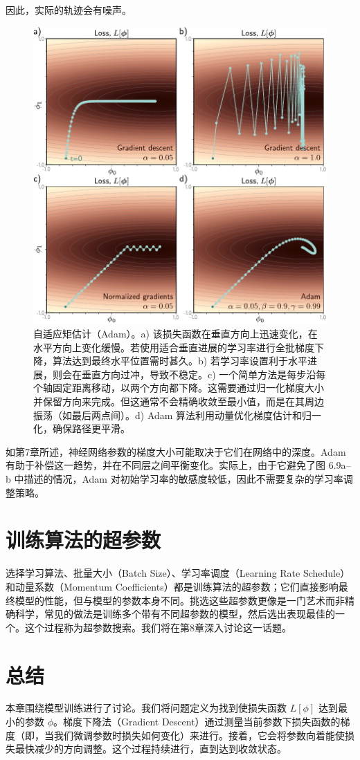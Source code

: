 \documentclass[lang=cn,newtx,10pt,scheme=chinese]{elegantbook}
\begin{document}
因此，实际的轨迹会有噪声。

\begin{figure}[ht!]
\centering
\includegraphics[width=0.7\linewidth]{PDFFigures/UDLChap6PDF/TrainADAM.pdf}
\caption{自适应矩估计（Adam）。a) 该损失函数在垂直方向上迅速变化，在水平方向上变化缓慢。若使用适合垂直进展的学习率进行全批梯度下降，算法达到最终水平位置需时甚久。b) 若学习率设置利于水平进展，则会在垂直方向过冲，导致不稳定。c) 一个简单方法是每步沿每个轴固定距离移动，以两个方向都下降。这需要通过归一化梯度大小并保留方向来完成。但这通常不会精确收敛至最小值，而是在其周边振荡（如最后两点间）。d) Adam 算法利用动量优化梯度估计和归一化，确保路径更平滑。}
\end{figure}

如第7章所述，神经网络参数的梯度大小可能取决于它们在网络中的深度。Adam 有助于补偿这一趋势，并在不同层之间平衡变化。实际上，由于它避免了图 6.9a–b 中描述的情况，Adam 对初始学习率的敏感度较低，因此不需要复杂的学习率调整策略。

\section{训练算法的超参数}
选择学习算法、批量大小（Batch Size）、学习率调度（Learning Rate Schedule）和动量系数（Momentum Coefficients）都是训练算法的超参数；它们直接影响最终模型的性能，但与模型的参数本身不同。挑选这些超参数更像是一门艺术而非精确科学，常见的做法是训练多个带有不同超参数的模型，然后选出表现最佳的一个。这个过程称为超参数搜索。我们将在第8章深入讨论这一话题。

\section{总结}
本章围绕模型训练进行了讨论。我们将问题定义为找到使损失函数 \(L[\phi]\) 达到最小的参数 \(\phi\)。梯度下降法（Gradient Descent）通过测量当前参数下损失函数的梯度（即，当我们微调参数时损失如何变化）来进行。接着，它会将参数向着能使损失最快减少的方向调整。这个过程持续进行，直到达到收敛状态。
\end{document}
